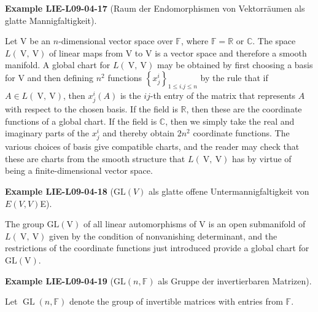 \documentclass[10pt, letterpaper]{article}
\newcommand{\GL}{\mathrm{GL}}
\newcommand{\CustomHeading}[3]{%
  \par\medskip\noindent%
  \textbf{#1 #2} \textnormal{(#3)}.\enskip%
}
\newenvironment{EXA}[2]{\CustomHeading{Example}{#1}{#2}}{}
\begin{document}
\begin{EXA}{LIE-L09-04-17}{Raum der Endomorphismen von Vektorräumen als glatte Mannigfaltigkeit}
Let V be an $n$-dimensional vector space over $\mathbb{F}$, where $\mathbb{F}=\mathbb{R}$ or $\mathbb{C}$. The space $L(\mathrm{~V}, \mathrm{~V})$ of linear maps from V to V is a vector space and therefore a smooth manifold. A global chart for $L(\mathrm{~V}, \mathrm{~V})$ may be obtained by first choosing a basis for V and then defining $n^{2}$ functions $\left\{x_{j}^{i}\right\}_{1 \leq i . j \leq n}$ by the rule that if $A \in L(\mathrm{~V}, \mathrm{~V})$, then $x_{j}^{i}(A)$ is the $i j$-th entry of the matrix that represents $A$ with respect to the chosen basis. If the field is $\mathbb{R}$, then these are the coordinate functions of a global chart. If the field is $\mathbb{C}$, then we simply take the real and imaginary parts of the $x_{j}^{i}$ and thereby obtain $2 n^{2}$ coordinate functions. The various choices of basis give compatible charts, and the reader may check that these are charts from the smooth structure that $L(\mathrm{~V}, \mathrm{~V})$ has by virtue of being a finite-dimensional vector space.
\end{EXA}

\begin{EXA}{LIE-L09-04-18}{$\GL(V)$ als glatte offene Untermannigfaltigkeit von $E(V,V)$E}
The group $\mathrm{GL}(\mathrm{V})$ of all linear automorphisms of V is an open submanifold of $L(\mathrm{~V}, \mathrm{~V})$ given by the condition of nonvanishing determinant, and the restrictions of the coordinate functions just introduced provide a global chart for $\mathrm{GL}(\mathrm{V})$.
\end{EXA}

\begin{EXA}{LIE-L09-04-19}{$\GL(n,\mathbb{F})$ als Gruppe der invertierbaren Matrizen}
Let $\operatorname{GL}(n, \mathbb{F})$ denote the group of invertible matrices with entries from $\mathbb{F}$.
\end{EXA}
\end{document}
